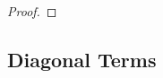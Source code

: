 \documentclass[twoside]{article}
\renewcommand{\ss}[1]{_{\text{#1}}}
\newcommand{\vw}{\mathbf{w}}
\newcommand{\vx}{\mathbf{x}}
\newcommand{\vz}{\mathbf{z}}
\newcommand{\vone}{\mathbf{1}}
\newcommand{\E}{\mathbb{E}}
\newcommand{\V}{\mathbb{V}}
\renewcommand{\ss}[1]{_{\text{#1}}}        %
\DeclarePairedDelimiter\lra{\langle}{\rangle}    %
\DeclarePairedDelimiter\norm{\|}{\|}             %
\DeclarePairedDelimiter\abs{|}{|}                %
\theoremstyle{theoremstyle}
\begin{document}
\begin{proof}
\end{proof}

\subsection{Diagonal Terms}\label{app:variance-diagonal}
\end{document}
